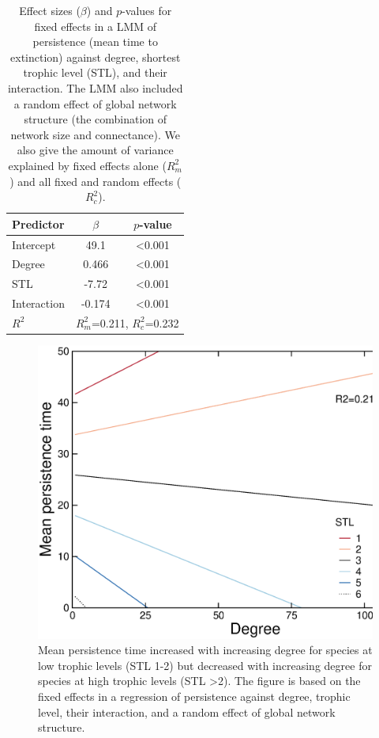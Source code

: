 \documentclass[12pt]{article}
\begin{document}
\begin{spacing}{2.0}
		\begin{table}[h!]
			\caption{Effect sizes ($\beta$) and $p$-values for fixed effects in a LMM of persistence (mean time to extinction) against degree, shortest trophic level (STL), and their interaction. The LMM also included a random effect of global network structure (the combination of network size and connectance). We also give the amount of variance explained by fixed effects alone ($R^2_m$) and all fixed and random effects ($R^2_c$).}
			\label{tab:per_degTL}
			\begin{tabular}{l | c c |}
			Predictor & $\beta$ & $p$-value \\
			\hline
			Intercept & 49.1 & \textless0.001 \\
			Degree & 0.466 & \textless0.001 \\
			STL & -7.72 & \textless0.001 \\
			Interaction & -0.174 & \textless0.001 \\
			\hline
			$R^2$ & \multicolumn{2}{|c}{$R^2_m$=0.211, $R^2_c$=0.232} \\
			\end{tabular}
			\end{table}


	    \begin{figure}[h!]
	        \centering
	        \includegraphics[width=\textwidth]{figures/roles/persistence_vs_degTL.eps}
	        \caption{Mean persistence time increased with increasing degree for species at low trophic levels (STL 1-2) but decreased with increasing degree for species at high trophic levels (STL \textgreater2). The figure is based on the fixed effects in a regression of persistence against degree, trophic level, their interaction, and a random effect of global network structure.}
	        \label{fig:persistence_degTL}
	    \end{figure}



\end{spacing}
\end{document}
